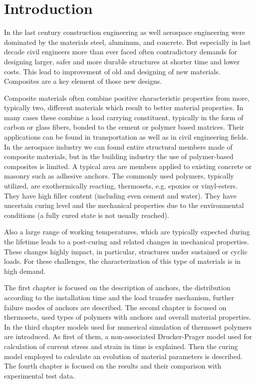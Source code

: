 \section*{Introduction}
\indent

In the last century construction engineering as well aerospace engineering  were dominated by the materials steel, aluminum, and concrete. But especially in last decade civil engineers more than ever faced often contradictory demands for designing larger, safer and more durable structures at shorter time and lower costs. This lead to improvement of old and designing of new materials. Composites are a key element of those new designs.

Composite materials often combine positive characteristic properties from more, typically two, different materials which result to better material properties. In many cases these combine a load carrying constituent, typically in the form of carbon or glass fibers, bonded to the cement or polymer based matrices. Their applications can be found in transportation as well as in civil engineering fields. In the aerospace industry we can found entire structural members made of composite materials, but in the building industry the use of polymer-based composites is limited. A typical area are members applied to existing concrete or masonry such as adhesive anchors. The commonly used polymers, typically utilized, are exothermically reacting, thermosets, e.g. epoxies or vinyl-esters. They have high filler content (including even cement and water). They have uncertain curing level and the mechanical properties due to the environmental conditions (a fully cured state is not usually reached).

Also a large range of working temperatures, which are typically expected during the lifetime leads to a post-curing and related changes in mechanical properties. These changes highly impact, in particular, structures under sustained or cyclic loads. For these challenges, the characterization of this type of materials is in high demand.  

The first chapter is focused on the description of anchors, the distribution according to the installation time and the load transfer mechanism, further failure modes of anchors are described. The second chapter is focused on thermosets, used types of polymers with anchors and overall material properties. In the third chapter models used for numerical simulation of thermoset polymers are introduced. As first of them, a non-associated Drucker-Prager model used for calculation of current stress and strain in time is explained. Then the curing model employed to calculate an evolution of material parameters is described. The fourth chapter is focused on the results and their comparison with experimental test data.

